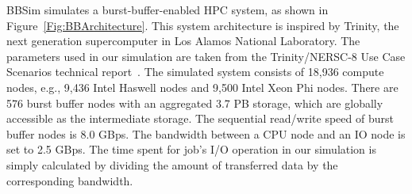 



BBSim simulates a burst-buffer-enabled HPC system, as shown in Figure~\ref{Fig:BBArchitecture}.
This system architecture is inspired by Trinity, 
the next generation supercomputer in Los Alamos National Laboratory.
The parameters used in our simulation are taken from the 
Trinity/NERSC-8 Use Case Scenarios technical report~\cite{TrinitySystem}.
The simulated system consists of 18,936 compute nodes,
e.g., 9,436 Intel Haswell nodes and 9,500 Intel Xeon Phi nodes.
There are 576 burst buffer nodes with an aggregated 3.7 PB storage, which are globally accessible as the intermediate storage.
The sequential read/write speed of burst buffer nodes is 8.0 GBps.
The bandwidth between a CPU node and an IO node is set to 2.5 GBps.
The time spent for job's I/O operation in our simulation is simply calculated by
dividing the amount of transferred data by the corresponding bandwidth.

